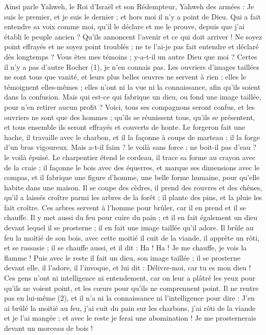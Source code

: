 \begin{multicols}{2}
Ainsi parle Yahweh, le Roi d'Israël et son Rédempteur, Yahweh des armées : Je suis le premier, et je suis le dernier ; et hors moi il n'y a point de Dieu.
Qui a fait entendre sa voix comme moi, qu’il le déclare et me le prouve, depuis que j’ai établi le peuple ancien ? Qu’ils annoncent l’avenir et ce qui doit arriver !
Ne soyez point effrayés et ne soyez point troublés ; ne te l'ai-je pas fait entendre et déclaré dès longtemps ? Vous êtes mes témoins ; y-a-t-il un autre Dieu que moi ? Certes il n'y a pas d'autre Rocher (1), je n'en connais pas.
Les ouvriers d’images taillées ne sont tous que vanité, et leurs plus belles œuvres ne servent à rien ; elles le témoignent elles-mêmes ; elles n’ont ni la vue ni la connaissance, afin qu'ils soient dans la confusion.
Mais qui est-ce qui fabrique un dieu, ou fond une image taillée, pour n'en retirer aucun profit ?
Voici, tous ses compagnons seront confus, et les ouvriers ne sont que des hommes ; qu’ils se réunissent tous, qu’ils se présentent, et tous ensemble ils seront effrayés et couverts de honte.
Le forgeron fait une hache, il travaille avec le charbon, et il la façonne à coups de marteau ; il la forge d’un bras vigoureux. Mais a-t-il faim ? le voilà sans force ; ne boit-il pas d’eau ? le voilà épuisé.
Le charpentier étend le cordeau, il trace sa forme au crayon avec de la craie ; il façonne le bois avec des équerres, et marque ses dimensions avec le compas, et il fabrique une figure d’homme, une belle forme humaine, pour qu’elle habite dans une maison.
Il se coupe des cèdres, il prend des rouvres et des chênes, qu'il a laissés croître parmi les arbres de la forêt ; il plante des pins, et la pluie les fait croître.
Ces arbres servent à l'homme pour brûler, car il en prend et il se chauffe. Il y met aussi du feu pour cuire du pain ; et il en fait également un dieu devant lequel il se prosterne ; il en fait une image taillée qu’il adore.
Il brûle au feu la moitié de son bois, avec cette moitié il cuit de la viande, il apprête un rôti, et se rassasie ; il se chauffe aussi, et il dit : Ha ! Ha ! Je me chauffe, je vois la flamme !
Puis avec le reste il fait un dieu, son image taillée ; il se prosterne devant elle, il l’adore, il l’invoque, et lui dit : Délivre-moi, car tu es mon dieu !
Ces gens n’ont ni intelligence ni entendement, car on leur a plâtré les yeux pour qu'ils ne voient point, et les cœurs pour qu'ils ne comprennent point.
Il ne rentre pas en lui-même (2), et il n’a ni la connaissance ni l’intelligence pour dire : J’en ai brûlé la moitié au feu, j’ai cuit du pain sur les charbons, j’ai rôti de la viande et je l’ai mangée ; et avec le reste je ferai une abomination ! Je me prosternerais devant un morceau de bois !

\end{multicols}
